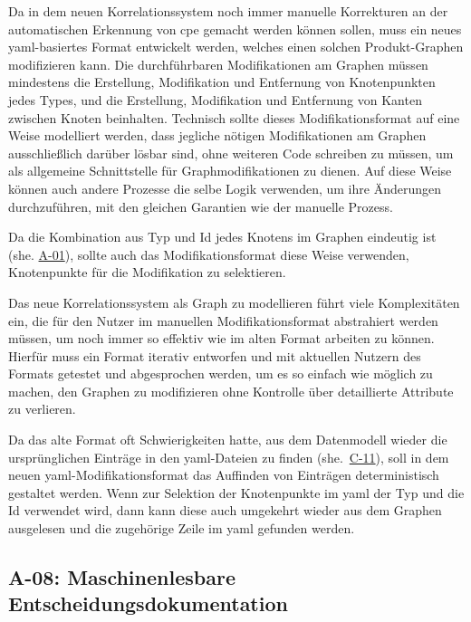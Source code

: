 Da in dem neuen Korrelationssystem noch immer manuelle Korrekturen an der automatischen Erkennung von \acrshort{cpe} gemacht werden können sollen, muss ein neues \acrshort{yaml}-basiertes Format entwickelt werden, welches einen solchen Produkt-Graphen modifizieren kann.
Die durchführbaren Modifikationen am Graphen müssen mindestens die Erstellung, Modifikation und Entfernung von Knotenpunkten jedes Types, und die Erstellung, Modifikation und Entfernung von Kanten zwischen Knoten beinhalten.
Technisch sollte dieses Modifikationsformat auf eine Weise modelliert werden, dass jegliche nötigen Modifikationen am Graphen ausschließlich darüber lösbar sind, ohne weiteren Code schreiben zu müssen, um als allgemeine Schnittstelle für Graphmodifikationen zu dienen.
Auf diese Weise können auch andere Prozesse die selbe Logik verwenden, um ihre Änderungen durchzuführen, mit den gleichen Garantien wie der manuelle Prozess.

Da die Kombination aus Typ und Id jedes Knotens im Graphen eindeutig ist (she. \hyperref[subsec:req-format-product-graph]{A-01}), sollte auch das Modifikationsformat diese Weise verwenden, Knotenpunkte für die Modifikation zu selektieren.

Das neue Korrelationssystem als Graph zu modellieren führt viele Komplexitäten ein, die für den Nutzer im manuellen Modifikationsformat abstrahiert werden müssen, um noch immer so effektiv wie im alten Format arbeiten zu können.
Hierfür muss ein Format iterativ entworfen und mit aktuellen Nutzern des Formats getestet und abgesprochen werden, um es so einfach wie möglich zu machen, den Graphen zu modifizieren ohne Kontrolle über detaillierte Attribute zu verlieren.

Da das alte Format oft Schwierigkeiten hatte, aus dem Datenmodell wieder die ursprünglichen Einträge in den \acrshort{yaml}-Dateien zu finden (she.\ \hyperref[subsec:c-11-finding-yaml-entries]{C-11}), soll in dem neuen \acrshort{yaml}-Modifikationsformat das Auffinden von Einträgen deterministisch gestaltet werden.
Wenn zur Selektion der Knotenpunkte im \acrshort{yaml} der Typ und die Id verwendet wird, dann kann diese auch umgekehrt wieder aus dem Graphen ausgelesen und die zugehörige Zeile im \acrshort{yaml} gefunden werden.

\subsection{A-08: Maschinenlesbare Entscheidungsdokumentation}\label{subsec:req-reason-format}

